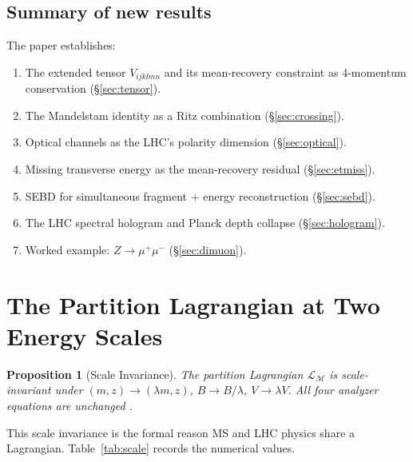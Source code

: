 \documentclass[twocolumn,10pt,a4paper]{article}
\theoremstyle{thmstyle}
\newtheorem{proposition}[theorem]{Proposition}
\theoremstyle{definition}
\theoremstyle{remark}
\newcommand{\LM}{\mathcal{L}_{\mathcal{M}}}
\begin{document}
\subsection{Summary of new results}

The paper establishes:
\begin{enumerate}[nosep]
\item The extended tensor $V_{ijklmn}$ and its mean-recovery constraint
as 4-momentum conservation (§\ref{sec:tensor}).
\item The Mandelstam identity as a Ritz combination
(§\ref{sec:crossing}).
\item Optical channels as the LHC's polarity dimension
(§\ref{sec:optical}).
\item Missing transverse energy as the mean-recovery residual
(§\ref{sec:etmiss}).
\item SEBD for simultaneous fragment + energy reconstruction
(§\ref{sec:sebd}).
\item The LHC spectral hologram and Planck depth collapse
(§\ref{sec:hologram}).
\item Worked example: $Z \to \mu^+\mu^-$
(§\ref{sec:dimuon}).
\end{enumerate}

\section{The Partition Lagrangian at Two Energy Scales}
\label{sec:lagrangian}

\begin{proposition}[Scale Invariance]
\label{prop:scale}
The partition Lagrangian $\LM$ is scale-invariant under
$(m, z) \to (\lambda m, z)$, $B \to B/\lambda$, $V \to \lambda V$.
All four analyzer equations are unchanged \citep{companion:spectrometer}.
\end{proposition}

This scale invariance is the formal reason MS and LHC physics share
a Lagrangian.  Table~\ref{tab:scale} records the numerical values.
\end{document}
